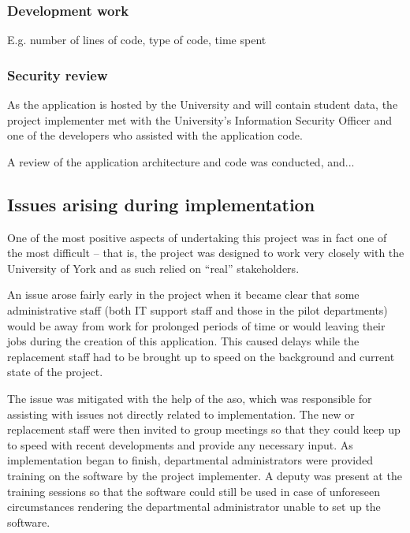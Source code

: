 \documentclass[]{scrartcl}
\begin{document}
\subsubsection{Development work}

E.g. number of lines of code, type of code, time spent



\subsubsection{Security review}

As the application is hosted by the University and will contain student data,
the project implementer met with the University's Information Security Officer
and one of the developers who assisted with the application code.

A review of the application architecture and code was conducted, and...

\subsection{Issues arising during implementation}



One of the most positive aspects of undertaking this project was in fact one
of the most difficult -- that is, the project was designed to work very
closely with the University of York and as such relied on ``real''
stakeholders.

An issue arose fairly early in the project when it became clear that some
administrative staff (both IT support staff and those in the pilot
departments) would be away from work for prolonged periods of time or would
leaving their jobs during the creation of this application. This caused delays
while the replacement staff had to be brought up to speed on the background
and current state of the project.

The issue was mitigated with the help of the \gls{aso}, which was responsible
for assisting with issues not directly related to implementation. The new or
replacement staff were then invited to group meetings so that they could keep
up to speed with recent developments and provide any necessary input. As
implementation began to finish, departmental administrators were provided
training on the software by the project implementer. A deputy was present at
the training sessions so that the software could still be used in case of
unforeseen circumstances rendering the departmental administrator unable to
set up the software.
\end{document}
